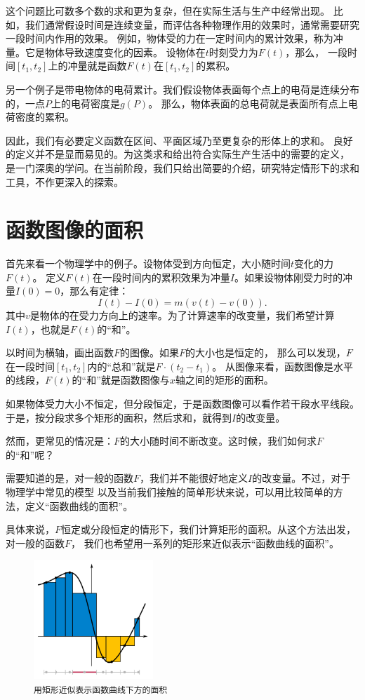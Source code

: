 \documentclass[12pt,UTF8]{ctexbook}
\begin{document}
这个问题比可数多个数的求和更为复杂，但在实际生活与生产中经常出现。
比如，我们通常假设时间是连续变量，而评估各种物理作用的效果时，通常需要研究一段时间内作用的效果。
例如，物体受的力在一定时间内的累计效果，称为冲量。它是物体导致速度变化的因素。
设物体在$t$时刻受力为$F(t)$，那么，
一段时间$[t_1, t_2]$上的冲量就是函数$F(t)$在$[t_1, t_2]$的累积。

另一个例子是带电物体的电荷累计。我们假设物体表面每个点上的电荷是连续分布的，一点$P$上的电荷密度是$g(P)$。
那么，物体表面的总电荷就是表面所有点上电荷密度的累积。

因此，我们有必要定义函数在区间、平面区域乃至更复杂的形体上的求和。
良好的定义并不是显而易见的。为这类求和给出符合实际生产生活中的需要的定义，
是一门深奥的学问。在当前阶段，我们只给出简要的介绍，研究特定情形下的求和工具，不作更深入的探索。

\section{函数图像的面积}

首先来看一个物理学中的例子。设物体受到方向恒定，大小随时间$t$变化的力$F(t)$。
定义$F(t)$在一段时间内的累积效果为冲量$I$。如果设物体刚受力时的冲量$I(0) = 0$，那么有定律：
$$ I(t) - I(0) = m(v(t) - v(0)).$$
其中$v$是物体的在受力方向上的速率。为了计算速率的改变量，我们希望计算$I(t)$，也就是$F(t)$的“和”。

以时间为横轴，画出函数$F$的图像。如果$F$的大小也是恒定的，
那么可以发现，$F$在一段时间$[t_1, t_2]$内的“总和”就是$F \cdot (t_2 - t_1)$。
从图像来看，函数图像是水平的线段，$F(t)$的“和”就是函数图像与$x$轴之间的矩形的面积。

如果物体受力大小不恒定，但分段恒定，于是函数图像可以看作若干段水平线段。
于是，按分段求多个矩形的面积，然后求和，就得到$I$的改变量。

然而，更常见的情况是：$F$的大小随时间不断改变。这时候，我们如何求$F$的“和”呢？

需要知道的是，对一般的函数$F$，我们并不能很好地定义$I$的改变量。不过，对于物理学中常见的模型
以及当前我们接触的简单形状来说，可以用比较简单的方法，定义“函数曲线的面积”。

具体来说，$F$恒定或分段恒定的情形下，我们计算矩形的面积。从这个方法出发，对一般的函数$F$，
我们也希望用一系列的矩形来近似表示“函数曲线的面积”。

\begin{figure}[h] %
    \vspace{4pt}
    \centering
    \includegraphics[width=0.4\textwidth]{tu/积分定义4.png}
    \caption*{\texttt{用矩形近似表示函数曲线下方的面积}}
\end{figure}
\end{document}

